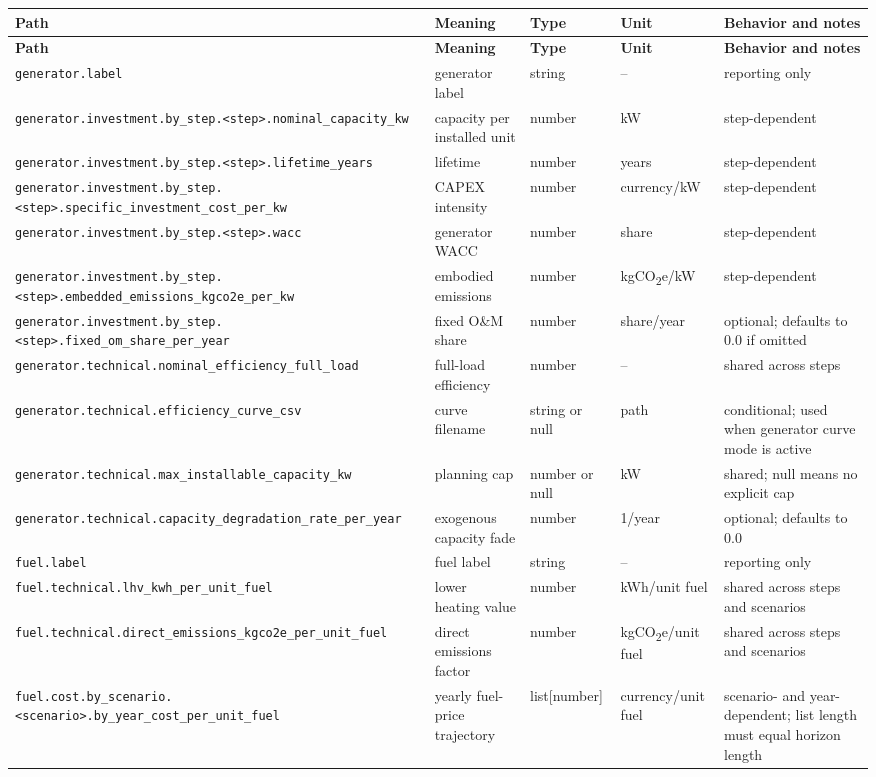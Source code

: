 \documentclass[11pt,a4paper]{report}
\newcommand{\code}[1]{\texttt{#1}}
\begin{document}
\begin{longtable}{p{}p{}p{}p{}p{}}
\toprule
\textbf{Path} & \textbf{Meaning} & \textbf{Type} & \textbf{Unit} & \textbf{Behavior and notes} \\
\midrule
\endfirsthead
\toprule
\textbf{Path} & \textbf{Meaning} & \textbf{Type} & \textbf{Unit} & \textbf{Behavior and notes} \\
\midrule
\endhead
\code{generator.label} & generator label & string & -- & reporting only \\
\code{generator.investment.by\_step.<step>.nominal\_capacity\_kw} & capacity per installed unit & number & kW & step-dependent \\
\code{generator.investment.by\_step.<step>.lifetime\_years} & lifetime & number & years & step-dependent \\
\code{generator.investment.by\_step.<step>.specific\_investment\_cost\_per\_kw} & CAPEX intensity & number & currency/kW & step-dependent \\
\code{generator.investment.by\_step.<step>.wacc} & generator WACC & number & share & step-dependent \\
\code{generator.investment.by\_step.<step>.embedded\_emissions\_kgco2e\_per\_kw} & embodied emissions & number & kgCO\textsubscript{2}e/kW & step-dependent \\
\code{generator.investment.by\_step.<step>.fixed\_om\_share\_per\_year} & fixed O\&M share & number & share/year & optional; defaults to 0.0 if omitted \\
\code{generator.technical.nominal\_efficiency\_full\_load} & full-load efficiency & number & -- & shared across steps \\
\code{generator.technical.efficiency\_curve\_csv} & curve filename & string or null & path & conditional; used when generator curve mode is active \\
\code{generator.technical.max\_installable\_capacity\_kw} & planning cap & number or null & kW & shared; null means no explicit cap \\
\code{generator.technical.capacity\_degradation\_rate\_per\_year} & exogenous capacity fade & number & 1/year & optional; defaults to 0.0 \\
\code{fuel.label} & fuel label & string & -- & reporting only \\
\code{fuel.technical.lhv\_kwh\_per\_unit\_fuel} & lower heating value & number & kWh/unit fuel & shared across steps and scenarios \\
\code{fuel.technical.direct\_emissions\_kgco2e\_per\_unit\_fuel} & direct emissions factor & number & kgCO\textsubscript{2}e/unit fuel & shared across steps and scenarios \\
\code{fuel.cost.by\_scenario.<scenario>.by\_year\_cost\_per\_unit\_fuel} & yearly fuel-price trajectory & list[number] & currency/unit fuel & scenario- and year-dependent; list length must equal horizon length \\
\bottomrule
\end{longtable}
\end{document}
